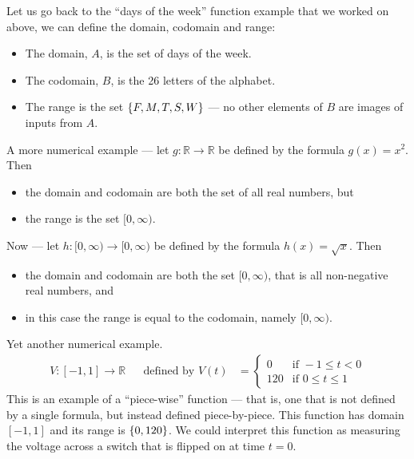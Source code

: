 \begin{eg}
Let us go back to the ``days of the week'' function example that we
worked on above, we can define the domain, codomain and range:
\begin{itemize}
 \item The domain, $A$, is the set of days of the week.
\item The codomain, $B$, is the 26 letters of the alphabet.
\item The range is the set $\left\{F,M,T,S,W\right\}$ --- no other elements of $B$ are
images of inputs from $A$.
\end{itemize}
\end{eg}
\begin{eg}
A more numerical example --- let $g: \mathbb{R} \to \mathbb{R}$ be defined
by the formula $g(x) = x^2$. Then
\begin{itemize}
 \item the domain and codomain are both the set of all real numbers, but
 \item the range is the set $[0, \infty)$.
\end{itemize}

Now --- let $h:[0,\infty) \to [0,\infty)$ be defined by the formula $h(x) =
\sqrt{x}$. Then
\begin{itemize}
 \item the domain and codomain are both the set $[0,\infty)$, that is all
non-negative real numbers, and
 \item in this case the range is equal to the codomain, namely $[0, \infty)$.
\end{itemize}
\end{eg}
\begin{eg}
\label{eg piecewise}
Yet another numerical example.
\begin{align*}
  V:[-1,1] \to \mathbb{R} && \text{defined by }
  V(t) &= \begin{cases}
          0 & \text{if } -1 \leq t < 0 \\
	  120 & \text{if } 0 \leq t \leq 1
          \end{cases}
\end{align*}
  This is an example of a ``piece-wise'' function --- that is, one that is not
defined by a single formula, but instead defined piece-by-piece. This function
has domain $[-1,1]$ and its range is $\left\{0,120\right\}$. We could interpret this
function as measuring the voltage across a switch that is flipped on at time $t=0$.
\end{eg}

